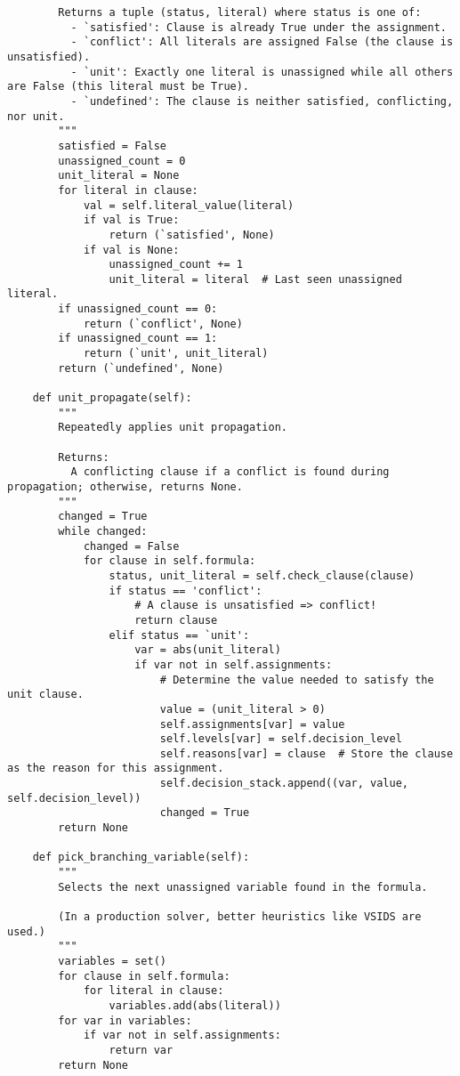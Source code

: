 \begin{lstlisting}
        Returns a tuple (status, literal) where status is one of:
          - `satisfied': Clause is already True under the assignment.
          - `conflict': All literals are assigned False (the clause is unsatisfied).
          - `unit': Exactly one literal is unassigned while all others are False (this literal must be True).
          - `undefined': The clause is neither satisfied, conflicting, nor unit.
        """
        satisfied = False
        unassigned_count = 0
        unit_literal = None
        for literal in clause:
            val = self.literal_value(literal)
            if val is True:
                return (`satisfied', None)
            if val is None:
                unassigned_count += 1
                unit_literal = literal  # Last seen unassigned literal.
        if unassigned_count == 0:
            return (`conflict', None)
        if unassigned_count == 1:
            return (`unit', unit_literal)
        return (`undefined', None)

    def unit_propagate(self):
        """
        Repeatedly applies unit propagation.
        
        Returns:
          A conflicting clause if a conflict is found during propagation; otherwise, returns None.
        """
        changed = True
        while changed:
            changed = False
            for clause in self.formula:
                status, unit_literal = self.check_clause(clause)
                if status == 'conflict':
                    # A clause is unsatisfied => conflict!
                    return clause
                elif status == `unit':
                    var = abs(unit_literal)
                    if var not in self.assignments:
                        # Determine the value needed to satisfy the unit clause.
                        value = (unit_literal > 0)
                        self.assignments[var] = value
                        self.levels[var] = self.decision_level
                        self.reasons[var] = clause  # Store the clause as the reason for this assignment.
                        self.decision_stack.append((var, value, self.decision_level))
                        changed = True
        return None

    def pick_branching_variable(self):
        """
        Selects the next unassigned variable found in the formula.
        
        (In a production solver, better heuristics like VSIDS are used.)
        """
        variables = set()
        for clause in self.formula:
            for literal in clause:
                variables.add(abs(literal))
        for var in variables:
            if var not in self.assignments:
                return var
        return None


\end{lstlisting}
